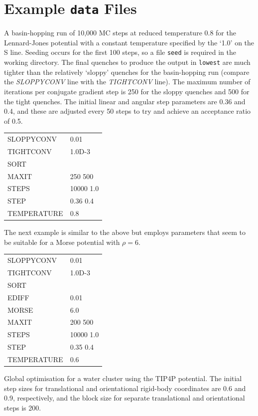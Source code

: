 {%


\section{Example {\tt data} Files}

A basin-hopping run of 10,000 MC steps at reduced temperature $0.8$ for the Lennard-Jones potential
with a constant temperature specified by the `1.0' on the {S\/} line.
Seeding occurs for the first 100 steps, so a file {\tt seed} is required in the 
working directory. The final quenches to produce the output in {\tt lowest} are much
tighter than the relatively `sloppy' quenches for the basin-hopping run (compare the
{\it SLOPPYCONV\/} line with the {\it TIGHTCONV\/} line). The maximum number of iterations per
conjugate gradient step is 250 for the sloppy quenches and 500 for the tight quenches.
The initial linear and angular step parameters are 0.36 and 0.4, and these are adjusted
every 50 steps to try and achieve an acceptance ratio of 0.5.

\medskip
\begin{tabular}{ll}
SLOPPYCONV & 0.01 \\
TIGHTCONV & 1.0D-3 \\
SORT \\
MAXIT & 250 500 \\
STEPS & 10000 1.0 \\
STEP & 0.36 0.4 \\
TEMPERATURE & 0.8 \\
\end{tabular}
\medskip

\noindent The next example is similar to the above but employs parameters that seem
to be suitable for a Morse potential with $\rho=6$.

\medskip
\begin{tabular}{ll}
SLOPPYCONV & 0.01 \\
TIGHTCONV & 1.0D-3 \\
SORT \\
EDIFF & 0.01\\
MORSE & 6.0\\
MAXIT & 200 500\\
STEPS & 10000 1.0\\
STEP & 0.35 0.4\\
TEMPERATURE & 0.6\\
\end{tabular}
\medskip

\noindent Global optimisation for a water cluster using the TIP4P potential.
The initial step sizes for translational and orientational rigid-body coordinates are
0.6 and 0.9, respectively, and the block size for separate translational and orientational
steps is 200.

}
